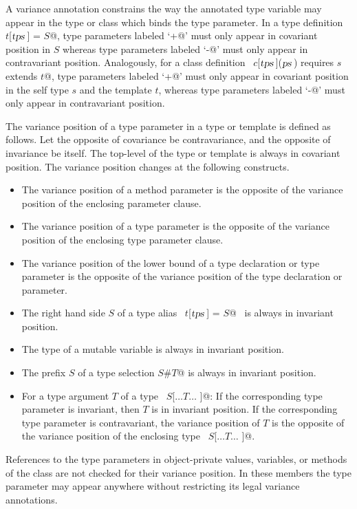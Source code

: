 A variance annotation constrains the way the annotated type variable
may appear in the type or class which binds the type parameter.  In a
type definition ~\lstinline@type $t$[$\mbox{\sl tps}\,$] = $S$@, type parameters labeled
`\lstinline@+@' must only appear in covariant position in $S$ whereas
type parameters labeled `\lstinline@-@' must only appear in contravariant
position. Analogously, for a class definition
~\lstinline@class $c$[$\mbox{\sl tps}\,$]($\mbox{\sl ps}\,$) requires $s$ extends $t$@, type parameters labeled
`\lstinline@+@' must only appear in covariant position in the self type
$s$ and the template $t$, whereas type
parameters labeled `\lstinline@-@' must only appear in contravariant
position. 

The variance position of a type parameter in a type or template is
defined as follows.  Let the opposite of covariance be contravariance,
and the opposite of invariance be itself.  The top-level of the type
or template is always in covariant position. The variance position
changes at the following constructs.
\begin{itemize}
\item
The variance position of a method parameter is the opposite of the 
variance position of the enclosing parameter clause.
\item
The variance position of a type parameter is the opposite of the
variance position of the enclosing type parameter clause.
\item
The variance position of the lower bound of a type declaration or type parameter 
is the opposite of the variance position of the type declaration or parameter.  
\item
The right hand side $S$ of a type alias ~\lstinline@type $t$[$\mbox{\sl tps}\,$] = $S$@~ 
is always in invariant position.
\item
The type of a mutable variable is always in invariant position.
\item 
The prefix $S$ of a type selection \lstinline@$S$#$T$@ is always in invariant position.
\item
For a type argument $T$ of a type ~\lstinline@$S$[$\ldots T \ldots$ ]@: If the
corresponding type parameter is invariant, then $T$ is in
invariant position.  If the corresponding type parameter is
contravariant, the variance position of $T$ is the opposite of
the variance position of the enclosing type ~\lstinline@$S$[$\ldots T \ldots$ ]@.
\end{itemize}
References to the type parameters in object-private values, variables,
or methods of the class are not checked for their variance
position. In these members the type parameter may appear anywhere
without restricting its legal variance annotations.

